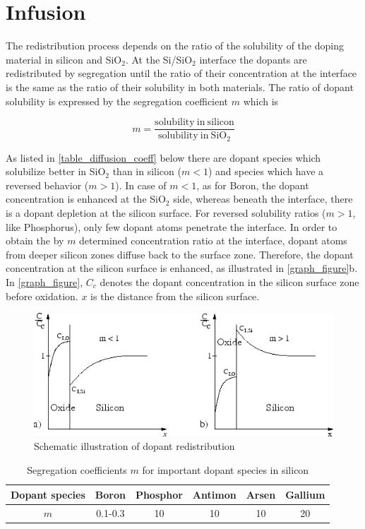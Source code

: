 \section{Infusion}
The redistribution process depends on the ratio of the solubility of the doping material in silicon and SiO$ _2$. At the Si/SiO$ _2$ interface the dopants are redistributed by segregation until the ratio of their concentration at the interface is the same as the ratio of their solubility in both materials. The ratio of dopant solubility is expressed by the segregation coefficient $m$ which is

\begin{equation}
\displaystyle m = \frac{
	\mathrm{solubility\ in\ silicon}
	}{
	\mathrm{solubility\ in\ SiO_2}
	}
\end{equation}

As listed in \autoref{table_diffusion_coeff} below there are dopant species which solubilize better in SiO$ _2$ than in silicon ($ m < 1$) and species which have a reversed behavior ($ m > 1$).
In case of $ m < 1$, as for Boron, the dopant concentration is enhanced at the SiO$ _2$ side, whereas beneath the interface, there is a dopant depletion at the silicon surface.
For reversed solubility ratios ($ m > 1$, like Phosphorus), only few dopant atoms penetrate the interface.
In order to obtain the by $ m$ determined concentration ratio at the interface, dopant atoms from deeper silicon zones diffuse back to the surface zone.
Therefore, the dopant concentration at the silicon surface is enhanced, as illustrated in \autoref{graph_figure}b.
In \autoref{graph_figure}, $ C_c$ denotes the dopant concentration in the silicon surface zone before oxidation. $ x$ is the distance from the silicon surface.

\begin{figure}[H]
	\centering
	\includegraphics[width=0.75\linewidth]{infusion_penetration.png}
	\caption{Schematic illustration of dopant redistribution}
	\label{graph_figure}
\end{figure}
\begin{table}[H]
	\centering
	\begin{tabular}{|c|c|c|c|c|c|}
		\hline
		Dopant species &
		Boron &
		Phosphor &
		Antimon &
		Arsen &
		Gallium \\
		\hline
		$m$ &
		0.1-0.3 &
		10 &
		10 &
		10 &
		20 \\
		\hline
	\end{tabular}
	\caption{Segregation coefficients $m$ for important dopant species in silicon}
	\label{table_diffusion_coeff}
\end{table}
